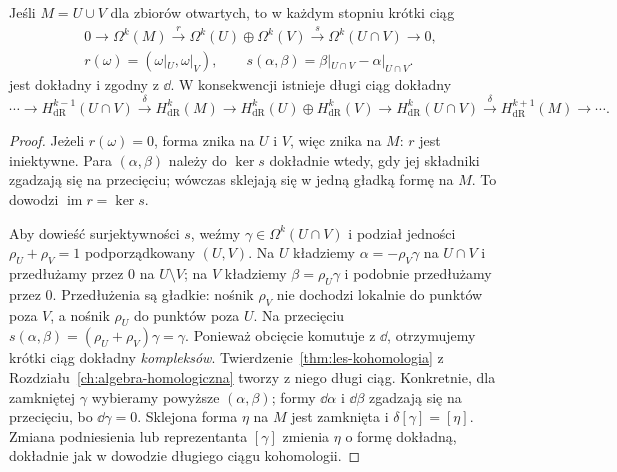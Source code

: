 \begin{twierdzenie}
\label{thm:mv-de-rham}
Jeśli $M=U\cup V$ dla zbiorów otwartych, to
w każdym stopniu krótki ciąg
\begin{equation}\label{eq:mv-formy-kompleks}
\begin{gathered}
0\to\Omega^k(M)\xrightarrow{\ r\ }
\Omega^k(U)\oplus\Omega^k(V)
\xrightarrow{\ s\ }\Omega^k(U\cap V)\to0,\\
r(\omega)=(\omega|_U,\omega|_V),\qquad
s(\alpha,\beta)=\beta|_{U\cap V}-\alpha|_{U\cap V}.
\end{gathered}
\end{equation}
jest dokładny i zgodny z $\dd$. W konsekwencji
istnieje długi ciąg dokładny
\[
 \cdots\to H^{k-1}_{\mathrm{dR}}(U\cap V)
 \xrightarrow{\delta}H^k_{\mathrm{dR}}(M)
 \to H^k_{\mathrm{dR}}(U)\oplus H^k_{\mathrm{dR}}(V)
 \to H^k_{\mathrm{dR}}(U\cap V)
 \xrightarrow{\delta}H^{k+1}_{\mathrm{dR}}(M)\to\cdots.
\]
\end{twierdzenie}
\begin{proof}
Jeżeli $r(\omega)=0$, forma znika na $U$ i $V$,
więc znika na $M$: $r$ jest iniektywne.
Para $(\alpha,\beta)$ należy do $\ker s$ dokładnie
wtedy, gdy jej składniki zgadzają się na przecięciu;
wówczas sklejają się w jedną gładką formę na $M$.
To dowodzi $\operatorname{im}r=\ker s$.

Aby dowieść surjektywności $s$, weźmy
$\gamma\in\Omega^k(U\cap V)$ i podział jedności
$\rho_U+\rho_V=1$ podporządkowany $(U,V)$.
Na $U$ kładziemy $\alpha=-\rho_V\gamma$ na
$U\cap V$ i przedłużamy przez $0$ na $U\setminus V$;
na $V$ kładziemy $\beta=\rho_U\gamma$
i podobnie przedłużamy przez $0$.
Przedłużenia są gładkie: nośnik $\rho_V$ nie
dochodzi lokalnie do punktów poza $V$, a nośnik
$\rho_U$ do punktów poza $U$. Na przecięciu
$s(\alpha,\beta)=(\rho_U+\rho_V)\gamma=\gamma$.
Ponieważ obcięcie komutuje z $\dd$, otrzymujemy
krótki ciąg dokładny \emph{kompleksów}.
Twierdzenie~\ref{thm:les-kohomologia} z
Rozdziału~\ref{ch:algebra-homologiczna} tworzy
z niego długi ciąg. Konkretnie, dla zamkniętej
$\gamma$ wybieramy powyższe $(\alpha,\beta)$;
formy $\dd\alpha$ i $\dd\beta$ zgadzają się
na przecięciu, bo $\dd\gamma=0$. Sklejona
forma $\eta$ na $M$ jest zamknięta i
$\delta[\gamma]=[\eta]$. Zmiana podniesienia
lub reprezentanta $[\gamma]$ zmienia $\eta$
o formę dokładną, dokładnie jak w dowodzie
długiego ciągu kohomologii.
\end{proof}

